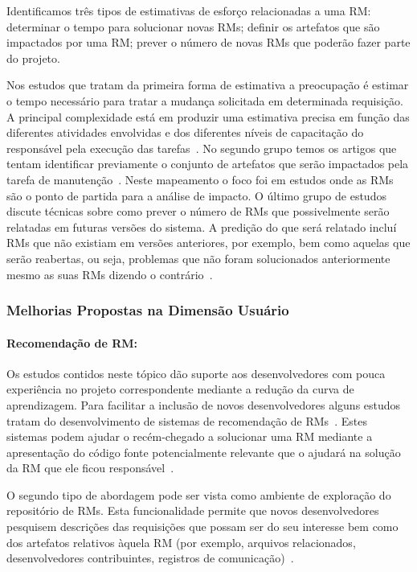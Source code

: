 Identificamos três tipos de estimativas de esforço relacionadas a uma RM\@:
determinar o tempo para solucionar novas RMs; definir os artefatos que são
impactados por uma RM\@; prever o número de novas RMs que poderão fazer parte do
projeto.

Nos estudos que tratam da primeira forma de estimativa a preocupação é estimar o
tempo necessário para tratar a mudança solicitada em determinada requisição. A
principal complexidade está em produzir uma estimativa precisa em função das
diferentes atividades envolvidas e dos diferentes níveis de capacitação do
responsável pela execução das tarefas~\cite{xia2015automatic}. No segundo grupo
temos os artigos que tentam identificar previamente o conjunto de artefatos que
serão impactados pela tarefa de manutenção~\cite{Nagwani2010}. Neste mapeamento
o foco foi em estudos onde as RMs são o ponto de partida para a análise de
impacto. O último grupo de estudos discute técnicas sobre como prever o número
de RMs que possivelmente serão relatadas em futuras versões do sistema. A
predição do que será relatado incluí RMs que não existiam em versões anteriores,
por exemplo, bem como aquelas que serão reabertas, ou seja, problemas que não
foram solucionados anteriormente mesmo as suas RMs dizendo o
contrário~\cite{xia2015automatic}.

\subsubsection{Melhorias Propostas na Dimensão Usuário}
\label{ssub:melhorias_dim_usuario}

\paragraph{Recomendação de RM:}

Os estudos contidos neste tópico dão suporte aos desenvolvedores com pouca
experiência no projeto correspondente mediante a redução da curva de
aprendizagem. Para facilitar a inclusão de novos desenvolvedores alguns estudos
tratam do desenvolvimento de sistemas de recomendação de
RMs~\cite{malheiros2012source, Wang2011bug}. Estes sistemas podem ajudar o
recém-chegado a solucionar uma RM mediante a apresentação do código fonte
potencialmente relevante que o ajudará na solução da RM que ele ficou
responsável~\cite{malheiros2012source}.

O segundo tipo de abordagem pode ser vista como ambiente de exploração do
repositório de RMs. Esta funcionalidade permite que novos desenvolvedores
pesquisem descrições das requisições que possam ser do seu interesse bem como
dos artefatos relativos àquela RM (por exemplo, arquivos relacionados,
desenvolvedores contribuintes, registros de comunicação)~\cite{Wang2011bug}.


